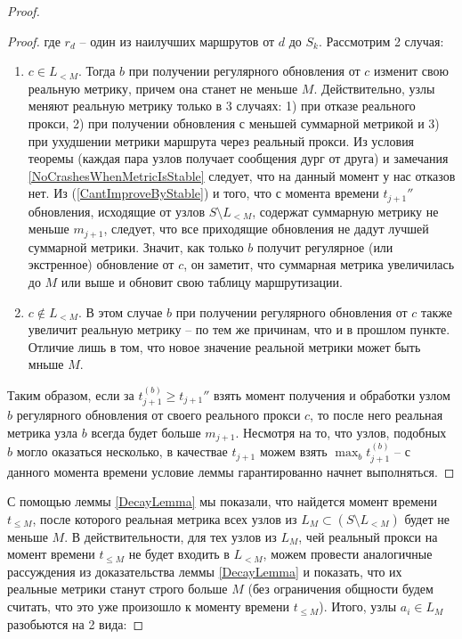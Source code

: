 \documentclass{article}
\theoremstyle{plain}
\theoremstyle{plain}
\theoremstyle{plain}
\theoremstyle{plain}
\theoremstyle{definition}
\theoremstyle{remark}
\theoremstyle{plain}
\begin{document}
\begin{proof}
\begin{proof}
        где $r_d$ -- один из наилучших маршрутов от $d$ до $S_k$. Рассмотрим 2 случая:
        
        \begin{enumerate}
            \item $c \in L_{< M}$. Тогда $b$ при получении регулярного обновления от $c$ изменит свою реальную метрику, причем она станет не меньше $M$. Действительно, узлы меняют реальную метрику только в 3 случаях: 1) при отказе реального прокси, 2) при получении обновления с меньшей суммарной метрикой и 3) при ухудшении метрики маршрута через реальный прокси. Из условия теоремы (каждая пара узлов получает сообщения дург от друга) и замечания \ref{NoCrashesWhenMetricIsStable} следует, что на данный момент у нас отказов нет. Из (\ref{CantImproveByStable}) и того, что с момента времени $t_{j + 1}''$ обновления, исходящие от узлов $S \setminus L_{< M}$, содержат суммарную метрику не меньше $m_{j + 1}$, следует, что все приходящие обновления не дадут лучшей суммарной метрики. Значит, как только $b$ получит регулярное (или экстренное) обновление от $c$, он заметит, что суммарная метрика увеличилась до $M$ или выше и обновит свою таблицу маршрутизации.
            
            \item $c \notin L_{< M}$. В этом случае $b$ при получении регулярного обновления от $c$ также увеличит реальную метрику -- по тем же причинам, что и в прошлом пункте. Отличие лишь в том, что новое значение реальной метрики может быть мньше $M$.
        \end{enumerate}
        
        Таким образом, если за $t_{j + 1}^{(b)} \geq t_{j + 1}''$ взять момент получения и обработки узлом $b$ регулярного обновления от своего реального прокси $c$, то после него реальная метрика узла $b$ всегда будет больше $m_{j + 1}$. Несмотря на то, что узлов, подобных $b$ могло оказаться несколько, в качествае $t_{j + 1}$ можем взять $\displaystyle \max_b t_{j + 1}^{(b)}$ -- с данного момента времени условие леммы гарантированно начнет выполняться.
    \end{proof}
    
    С помощью леммы \ref{DecayLemma} мы показали, что найдется момент времени $t_{\leq M}$, после которого реальная метрика всех узлов из $L_M \subset (S \setminus L_{< M})$ будет не меньше $M$. В действительности, для тех узлов из $L_M$, чей реальный прокси на момент времени $t_{\leq M}$ не будет входить в $L_{< M}$, можем провести аналогичные рассуждения из доказательства леммы \ref{DecayLemma} и показать, что их реальные метрики станут строго больше $M$ (без ограничения общности будем считать, что это уже произошло к моменту времени $t_{\leq M}$). Итого, узлы $a_i \in L_M$ разобьются на 2 вида:
    

\end{proof}
\end{document}
